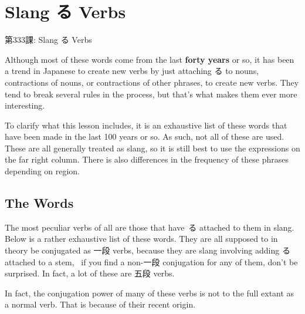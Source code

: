     
\chapter{Slang る Verbs}

\begin{center}
\begin{Large}
第333課: Slang る Verbs 
\end{Large}
\end{center}
 
\par{ Although most of these words come from the last \textbf{forty years }or so, it has been a trend in Japanese to create new verbs by just attaching る to nouns, contractions of nouns, or contractions of other phrases, to create new verbs. They tend to break several rules in the process, but that's what makes them ever more interesting. }

\par{ To clarify what this lesson includes, it is an exhaustive list of these words that have been made in the last 100 years or so. As such, not all of these are used. These are all generally treated as slang, so it is still best to use the expressions on the far right column. There is also differences in the frequency of these phrases depending on region. }
      
\section{The Words}
 
\par{ The most peculiar verbs of all are those that have る attached to them in slang. Below is a rather exhaustive list of these words. They are all supposed to in theory be conjugated as 一段 verbs, because they are slang involving adding る attached to a stem,  if you find a non-一段 conjugation for any of them, don't be surprised. In fact, a lot of these are 五段 verbs. }

\par{ In fact, the conjugation power of many of these verbs is not to the full extant as a normal verb. That is because of their recent origin. }

